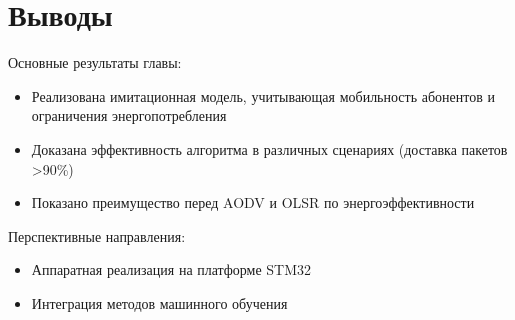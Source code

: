 \section{Выводы} \label{ch3:conclusion}

Основные результаты главы:
\begin{itemize}
    \item Реализована имитационная модель, учитывающая мобильность абонентов и ограничения энергопотребления
    \item Доказана эффективность алгоритма в различных сценариях (доставка пакетов >90\%)
    \item Показано преимущество перед AODV и OLSR по энергоэффективности
\end{itemize}

Перспективные направления:
\begin{itemize}
    \item Аппаратная реализация на платформе STM32
    \item Интеграция методов машинного обучения
\end{itemize}